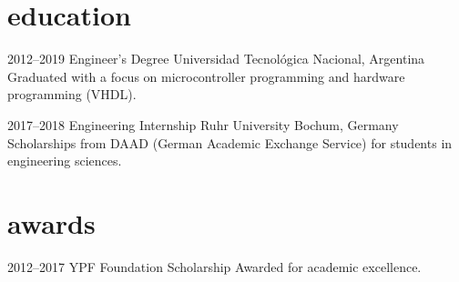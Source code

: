 \documentclass[a4paper,nocolors]{friggeri-cv}
\begin{document}
\vspace{-1em}
\section{education}

\begin{entrylist}


\entry
{2012--2019}
{Engineer’s Degree}
{Universidad Tecnológica Nacional, Argentina}
{Graduated with a focus on microcontroller programming and hardware programming (VHDL).}


\entry
{2017--2018}
{Engineering Internship}
{Ruhr University Bochum, Germany}
{Scholarships from DAAD (German Academic Exchange Service) for students in engineering sciences.}

\end{entrylist}

\vspace{-1em}
\section{awards}

\begin{entrylist}


\entry
{2012–2017}
{YPF Foundation Scholarship}
{Awarded for academic excellence.}

\end{entrylist}



\end{document}
